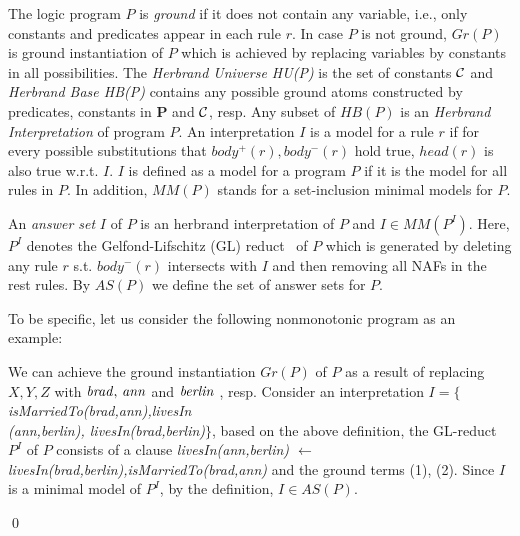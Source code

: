 The logic program $P$ is \textit{ground} if it does not contain any variable, i.e., only constants and predicates appear in each rule $r$. In case $P$ is not ground, $Gr(P)$ is ground instantiation of $P$ which is achieved by replacing variables by constants in all possibilities. The \textit{Herbrand Universe HU(P)} is the set of constants $\mathcal{C}$ and \textit{Herbrand Base HB(P)} contains any possible ground atoms constructed by predicates, constants in \textbf{P} and $\mathcal{C}$, resp. Any subset of $HB(P)$ is an \textit{Herbrand Interpretation} of program $P$. An interpretation $I$ is a model for a rule $r$ if for every possible substitutions that $body^+(r), body^-(r)$ hold true, $head(r)$ is also true w.r.t. $I$. $I$ is defined as a model for a program $P$ if it is the model for all rules in $P$. In addition, $MM(P)$ stands for a set-inclusion minimal models for $P$.

An \textit{answer set} $I$ of $P$ is an herbrand interpretation of $P$ and $I \in MM(P^I)$. Here, $P^I$ denotes the Gelfond-Lifschitz (GL) reduct~\cite{ref50} of $P$ which is generated by deleting any rule $r$ s.t. $body^-(r)$ intersects with $I$ and then removing all NAFs in the rest rules. By $AS(P)$ we define the set of answer sets for $P$.

\begin{example}\label{ex:as}
To be specific, let us consider the following nonmonotonic program as an example:\\
{\small {}}
            
\normalsize
{\smallskip

\noindent            
We can achieve the ground instantiation $Gr(P)$ of $P$ as a result of replacing $X,Y,Z$ with $\mathit{brad, \,ann}$ and $\mathit{berlin}$ , resp. Consider an interpretation $I=\{${\small\textit{isMarriedTo(brad,ann),livesIn\\(ann,berlin), livesIn(brad,berlin)}}$\}$, based on the above definition, the GL-reduct $P^I$ of $P$ consists of a clause \textit{livesIn(ann,berlin) $\leftarrow$ livesIn(brad,berlin),isMarriedTo(brad,ann)} and the ground terms (1), (2). Since $I$ is a minimal model of $P^I$, by the definition, $I \in AS(P)$.}\qed
\end{example}



